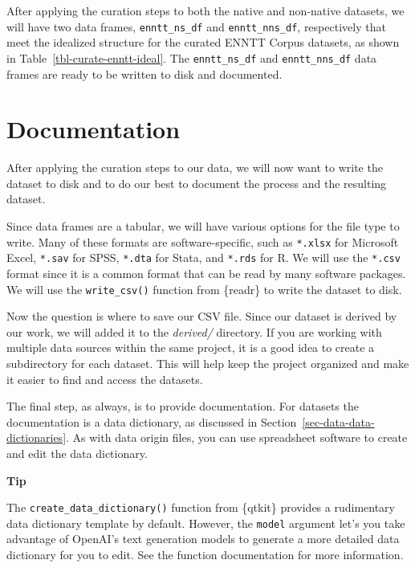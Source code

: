 \documentclass[
  letterpaper,
  krantz1]{latex/krantz-mod}
\theoremstyle{definition}
\theoremstyle{definition}
\theoremstyle{remark}
\begin{document}
After applying the curation steps to both the native and non-native
datasets, we will have two data frames, \texttt{enntt\_ns\_df} and
\texttt{enntt\_nns\_df}, respectively that meet the idealized structure
for the curated ENNTT Corpus datasets, as shown in
Table~\ref{tbl-curate-enntt-ideal}. The \texttt{enntt\_ns\_df} and
\texttt{enntt\_nns\_df} data frames are ready to be written to disk and
documented.

\section{Documentation}\label{documentation}

After applying the curation steps to our data, we will now want to write
the dataset to disk and to do our best to document the process and the
resulting dataset.

Since data frames are a tabular, we will have various options for the
file type to write. Many of these formats are software-specific, such as
\texttt{*.xlsx} for Microsoft Excel, \texttt{*.sav} for SPSS,
\texttt{*.dta} for Stata, and \texttt{*.rds} for R. We will use the
\texttt{*.csv} format since it is a common format that can be read by
many software packages. We will use the \texttt{write\_csv()} function
from \{readr\} to write the dataset to disk.

Now the question is where to save our CSV file. Since our dataset is
derived by our work, we will added it to the \emph{derived/} directory.
If you are working with multiple data sources within the same project,
it is a good idea to create a subdirectory for each dataset. This will
help keep the project organized and make it easier to find and access
the datasets.

The final step, as always, is to provide documentation. For datasets the
documentation is a data dictionary, as discussed in
Section~\ref{sec-data-data-dictionaries}. As with data origin files, you
can use spreadsheet software to create and edit the data dictionary.

\begin{tcolorbox}[enhanced jigsaw, leftrule=.75mm, colframe=quarto-callout-color-frame, left=2mm, colback=white, toprule=.15mm, breakable, arc=.35mm, opacityback=0, bottomrule=.15mm, rightrule=.15mm]

\textbf{ Tip}

The \texttt{create\_data\_dictionary()} function from \{qtkit\} provides
a rudimentary data dictionary template by default. However, the
\texttt{model} argument let's you take advantage of OpenAI's text
generation models to generate a more detailed data dictionary for you to
edit. See the function documentation for more information.

\end{tcolorbox}
\end{document}
